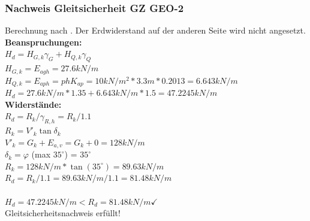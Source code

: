 \documentclass[11pt,fleqn,a4paper,halfparskip]{article}
\begin{document}
\subsubsection{Nachweis Gleitsicherheit GZ GEO-2}
Berechnung nach \cite[S.98]{wsp}. Der Erdwiderstand auf der anderen Seite wird nicht angesetzt.\\
\textbf{Beanspruchungen:}\\
$H_d = H_{G,k}\gamma_G + H_{Q,k}\gamma_Q$ \\
$H_{G,k} = E_{agh} = 27.6kN/m $\\
$H_{Q,k} = E_{aph} = phK_{ap} = 10kN/m^2*3.3m*0.2013 = 6.643kN/m $\\
$H_d = 27.6kN/m * 1.35 + 6.643kN/m * 1.5 = 47.2245kN/m$\\
\newpage
\textbf{Widerstände:}\\
$R_d = R_k/\gamma_{R,h} = R_k/1.1$ \\
$R_k = V'_k \tan\delta_k$\\
$V'_k = G_k + E_{a,v} = G_k + 0 = 128kN/m$\\
$\delta_k = \varphi$ (max $35^\circ$) = $35^\circ$\\
$R_k = 128kN/m * \tan(35^\circ) = 89.63kN/m$ \\
$R_d = R_k/1.1 = 89.63kN/m/1.1 = 81.48kN/m$ \\
\\
$H_d = 47.2245kN/m < R_d = 81.48kN/m \checkmark$ \\
Gleitsicherheitsnachweis erfüllt!
\end{document}
